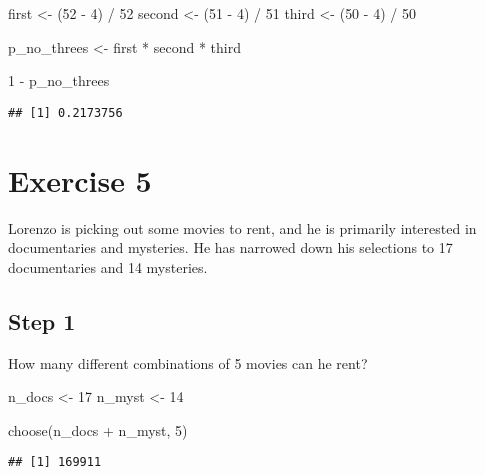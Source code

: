 \documentclass[
]{article}
\newenvironment{Shaded}{\begin{snugshade}}{\end{snugshade}}
\newcommand{\DecValTok}[1]{\textcolor[rgb]{0.00,0.00,0.81}{#1}}
\newcommand{\FunctionTok}[1]{\textcolor[rgb]{0.00,0.00,0.00}{#1}}
\newcommand{\NormalTok}[1]{#1}
\newcommand{\OtherTok}[1]{\textcolor[rgb]{0.56,0.35,0.01}{#1}}
\newcommand{\SpecialCharTok}[1]{\textcolor[rgb]{0.00,0.00,0.00}{#1}}
\begin{document}
\begin{Shaded}
\begin{Highlighting}[]
\NormalTok{first }\OtherTok{\textless{}{-}}\NormalTok{ (}\DecValTok{52} \SpecialCharTok{{-}} \DecValTok{4}\NormalTok{) }\SpecialCharTok{/} \DecValTok{52}
\NormalTok{second }\OtherTok{\textless{}{-}}\NormalTok{ (}\DecValTok{51} \SpecialCharTok{{-}} \DecValTok{4}\NormalTok{) }\SpecialCharTok{/} \DecValTok{51}
\NormalTok{third }\OtherTok{\textless{}{-}}\NormalTok{ (}\DecValTok{50} \SpecialCharTok{{-}} \DecValTok{4}\NormalTok{) }\SpecialCharTok{/} \DecValTok{50}

\NormalTok{p\_no\_threes }\OtherTok{\textless{}{-}}\NormalTok{ first }\SpecialCharTok{*}\NormalTok{ second }\SpecialCharTok{*}\NormalTok{ third}

\DecValTok{1} \SpecialCharTok{{-}}\NormalTok{ p\_no\_threes}
\end{Highlighting}
\end{Shaded}

\begin{verbatim}
## [1] 0.2173756
\end{verbatim}

\hypertarget{exercise-5}{%
\section{Exercise 5}\label{exercise-5}}

Lorenzo is picking out some movies to rent, and he is primarily
interested in documentaries and mysteries. He has narrowed down his
selections to 17 documentaries and 14 mysteries.

\hypertarget{step-1}{%
\subsection{Step 1}\label{step-1}}

How many different combinations of 5 movies can he rent?

\begin{Shaded}
\begin{Highlighting}[]
\NormalTok{n\_docs }\OtherTok{\textless{}{-}} \DecValTok{17}
\NormalTok{n\_myst }\OtherTok{\textless{}{-}} \DecValTok{14}

\FunctionTok{choose}\NormalTok{(n\_docs }\SpecialCharTok{+}\NormalTok{ n\_myst, }\DecValTok{5}\NormalTok{)}
\end{Highlighting}
\end{Shaded}

\begin{verbatim}
## [1] 169911
\end{verbatim}
\end{document}
